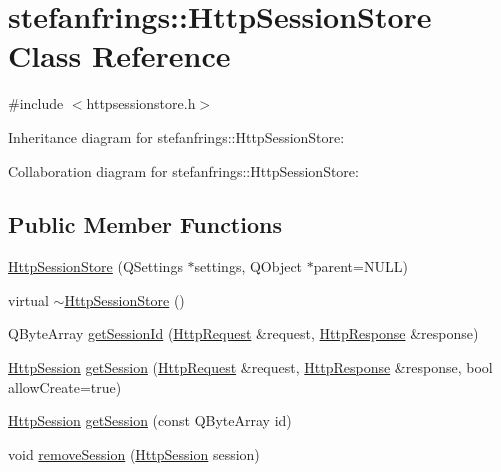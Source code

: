 \hypertarget{classstefanfrings_1_1_http_session_store}{}\section{stefanfrings\+:\+:Http\+Session\+Store Class Reference}
\label{classstefanfrings_1_1_http_session_store}


{\ttfamily \#include $<$httpsessionstore.\+h$>$}



Inheritance diagram for stefanfrings\+:\+:Http\+Session\+Store\+:


Collaboration diagram for stefanfrings\+:\+:Http\+Session\+Store\+:
\subsection*{Public Member Functions}
\begin{DoxyCompactItemize}
\item 
\mbox{\hyperlink{classstefanfrings_1_1_http_session_store_a4404d037bc389162148b66b8392580c6}{Http\+Session\+Store}} (Q\+Settings $\ast$settings, Q\+Object $\ast$parent=N\+U\+LL)
\item 
virtual \mbox{\hyperlink{classstefanfrings_1_1_http_session_store_a06062155c1dc31ede2cbc5f31bce4df3}{$\sim$\+Http\+Session\+Store}} ()
\item 
Q\+Byte\+Array \mbox{\hyperlink{classstefanfrings_1_1_http_session_store_aaf9147137698db03b322ea93de548fba}{get\+Session\+Id}} (\mbox{\hyperlink{classstefanfrings_1_1_http_request}{Http\+Request}} \&request, \mbox{\hyperlink{classstefanfrings_1_1_http_response}{Http\+Response}} \&response)
\item 
\mbox{\hyperlink{classstefanfrings_1_1_http_session}{Http\+Session}} \mbox{\hyperlink{classstefanfrings_1_1_http_session_store_aeaf8409e1844366c12f18fd34d477a31}{get\+Session}} (\mbox{\hyperlink{classstefanfrings_1_1_http_request}{Http\+Request}} \&request, \mbox{\hyperlink{classstefanfrings_1_1_http_response}{Http\+Response}} \&response, bool allow\+Create=true)
\item 
\mbox{\hyperlink{classstefanfrings_1_1_http_session}{Http\+Session}} \mbox{\hyperlink{classstefanfrings_1_1_http_session_store_ab197132dc4713cd647705d09c9f84ba8}{get\+Session}} (const Q\+Byte\+Array id)
\item 
void \mbox{\hyperlink{classstefanfrings_1_1_http_session_store_a572d35ddc23b3ecac7c40aecc2b40a5e}{remove\+Session}} (\mbox{\hyperlink{classstefanfrings_1_1_http_session}{Http\+Session}} session)
\end{DoxyCompactItemize}
